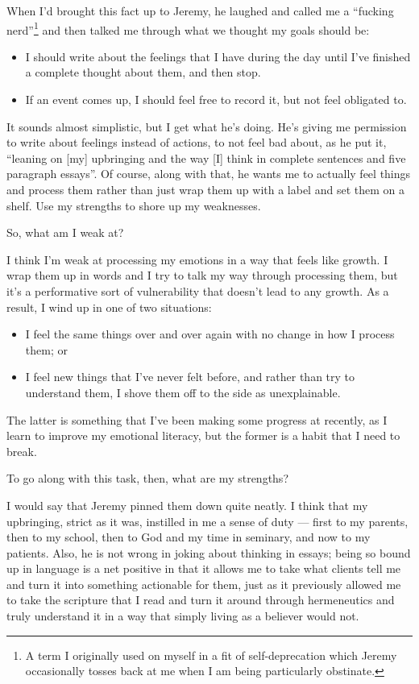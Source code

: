 When I'd brought this fact up to Jeremy, he laughed and called me a ``fucking nerd''\footnote{A term I originally used on myself in a fit of self-deprecation which Jeremy occasionally tosses back at me when I am being particularly obstinate.} and then talked me through what we thought my goals should be:

\begin{itemize}
\tightlist
\item
  I should write about the feelings that I have during the day until I've finished a complete thought about them, and then stop.
\item
  If an event comes up, I should feel free to record it, but not feel obligated to.
\end{itemize}

It sounds almost simplistic, but I get what he's doing. He's giving me permission to write about feelings instead of actions, to not feel bad about, as he put it, ``leaning on {[}my{]} upbringing and the way {[}I{]} think in complete sentences and five paragraph essays''. Of course, along with that, he wants me to actually feel things and process them rather than just wrap them up with a label and set them on a shelf. Use my strengths to shore up my weaknesses.

So, what am I weak at?

I think I'm weak at processing my emotions in a way that feels like growth. I wrap them up in words and I try to talk my way through processing them, but it's a performative sort of vulnerability that doesn't lead to any growth. As a result, I wind up in one of two situations:

\begin{itemize}
\tightlist
\item
  I feel the same things over and over again with no change in how I process them; or
\item
  I feel new things that I've never felt before, and rather than try to understand them, I shove them off to the side as unexplainable.
\end{itemize}

The latter is something that I've been making some progress at recently, as I learn to improve my emotional literacy, but the former is a habit that I need to break.

To go along with this task, then, what are my strengths?

I would say that Jeremy pinned them down quite neatly. I think that my upbringing, strict as it was, instilled in me a sense of duty --- first to my parents, then to my school, then to God and my time in seminary, and now to my patients. Also, he is not wrong in joking about thinking in essays; being so bound up in language is a net positive in that it allows me to take what clients tell me and turn it into something actionable for them, just as it previously allowed me to take the scripture that I read and turn it around through hermeneutics and truly understand it in a way that simply living as a believer would not.

